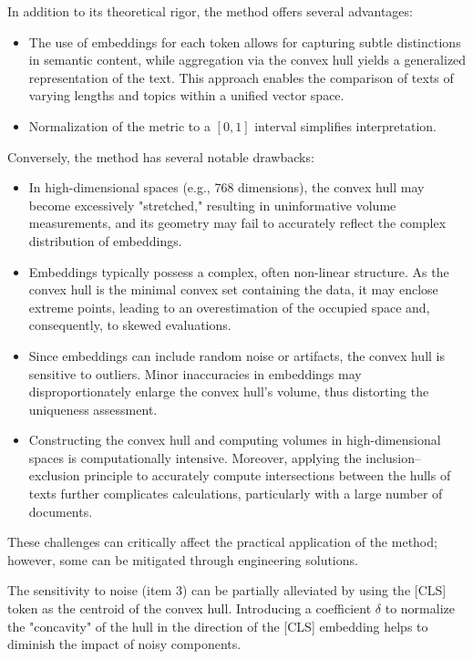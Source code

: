 In addition to its theoretical rigor, the method offers several advantages:
\begin{itemize}
    \item The use of embeddings for each token allows for capturing subtle distinctions in semantic content, while aggregation via the convex hull
    yields a generalized representation of the text. This approach enables the comparison of texts of varying lengths and topics within a unified vector space.
    \item Normalization of the metric to a $[0,1]$ interval simplifies interpretation.
\end{itemize}

Conversely, the method has several notable drawbacks:
\begin{itemize}
    \item In high-dimensional spaces (e.g., 768 dimensions), the convex hull may become excessively "stretched," resulting in uninformative volume measurements,
    and its geometry may fail to accurately reflect the complex distribution of embeddings.
    \item Embeddings typically possess a complex, often non-linear structure. As the convex hull is the minimal convex set containing the data, it may enclose
    extreme points, leading to an overestimation of the occupied space and, consequently, to skewed evaluations.
    \item Since embeddings can include random noise or artifacts, the convex hull is sensitive to outliers. Minor inaccuracies in embeddings may
    disproportionately enlarge the convex hull’s volume, thus distorting the uniqueness assessment.
    \item Constructing the convex hull and computing volumes in high-dimensional spaces is computationally intensive. Moreover, applying the inclusion–exclusion
    principle to accurately compute intersections between the hulls of texts further complicates calculations, particularly with a large number of documents.
\end{itemize}

These challenges can critically affect the practical application of the method; however, some can be mitigated through engineering solutions.

The sensitivity to noise (item 3) can be partially alleviated by using the [CLS] token as the centroid of the convex hull. Introducing a coefficient
$\delta$ to normalize the "concavity" of the hull in the direction of the [CLS] embedding helps to diminish the impact of noisy components.

